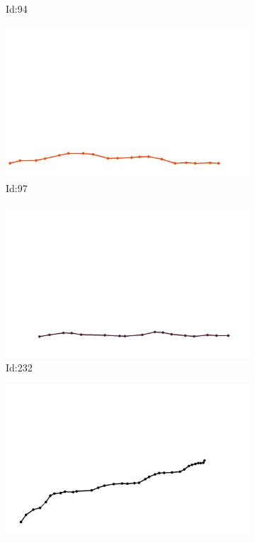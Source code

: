 \documentclass[12pt,twoside]{report}
\begin{document}
\begin{figure}
\begin{subfigure}[b]{0.20\textwidth}
\caption{Id:94}
\end{subfigure}
\begin{subfigure}[b]{0.20\textwidth}
\centering
\includegraphics[width=\textwidth]{../trajectories/97.png}
\caption{Id:97}
\end{subfigure}
\begin{subfigure}[b]{0.20\textwidth}
\centering
\includegraphics[width=\textwidth]{../trajectories/232.png}
\caption{Id:232}
\end{subfigure}
\begin{subfigure}[b]{0.20\textwidth}
\centering
\includegraphics[width=\textwidth]{../trajectories/245.png}

\end{subfigure}
\end{figure}
\end{document}
